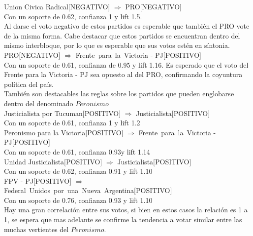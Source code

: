 \documentclass{endm}
\begin{document}
{Union Civica Radical[NEGATIVO]}  $\Longrightarrow$ {PRO[NEGATIVO]}\\

Con un soporte de 0.62, confianza 1 y lift 1.5.\\

Al darse el voto negativo de estos partidos es esperable que también el PRO vote de la misma forma. Cabe destacar que estos partidos se encuentran dentro del mismo interbloque, por lo que es esperable que sus votos estén en síntonia. \\

{PRO[NEGATIVO]}  $\Longrightarrow$ {Frente\ para\ la\ Victoria - PJ[POSITIVO]} \\

Con un soporte de 0.61, confianza de  0.95 y lift 1.16. Es esperado que el voto del Frente para la Victoria - PJ sea opuesto al del PRO, confirmando la coyuntura política del país. \\ 

También son destacables las reglas sobre los partidos que pueden englobarse dentro del denominado $Peronismo$ \\

{Justicialista por Tucuman[POSITIVO]} $\Longrightarrow$ {Justicialista[POSITIVO]} \\

Con un soporte de  0.61, confianza 1 y lift 1.2\\

{Peronismo para la Victoria[POSITIVO]} $\Longrightarrow$ {Frente\ para\ la\ Victoria - PJ[POSITIVO]}  \\

Con un soporte de 0.61, confianza 0.93y lift 1.14\\

{Unidad Justicialista[POSITIVO]}  $\Longrightarrow$ {Justicialista[POSITIVO]} \\

Con un soporte de 0.62, confianza 0.91 y lift 1.10\\

{FPV - PJ[POSITIVO]} $\Longrightarrow$ {Federal\ Unidos\ por\ una\ Nueva\ Argentina[POSITIVO]}\\

Con un soporte de 0.76, confianza 0.93 y lift 1.10\\

Hay una gran correlación entre sus votos, si bien en estos casos la relación es 1 a 1, se espera que mas adelante se confirme la tendencia a votar similar entre las muchas vertientes del $Peronismo$.\\
\end{document}
